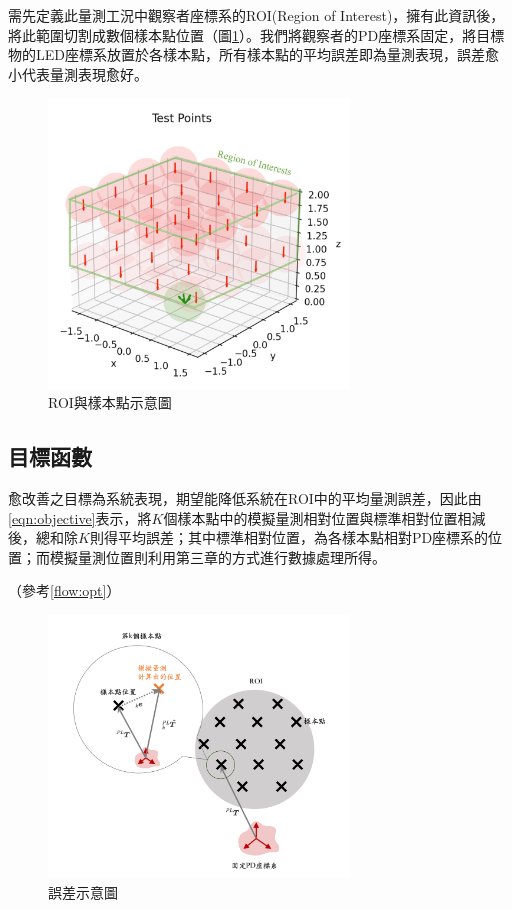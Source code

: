 需先定義此量測工況中觀察者座標系的ROI(Region of Interest)，擁有此資訊後，將此範圍切割成數個樣本點位置（圖\ref{pic:testpoint}）。我們將觀察者的PD座標系固定，將目標物的LED座標系放置於各樣本點，所有樣本點的平均誤差即為量測表現，誤差愈小代表量測表現愈好。

\begin{figure}[ht]
    \centering
    \includegraphics[width=8cm]{ch3pic/testpoint.jpg}
    \caption{ROI與樣本點示意圖}
    \label{pic:testpoint}
\end{figure}

\clearpage

\subsection{目標函數}

愈改善之目標為系統表現，期望能降低系統在ROI中的平均量測誤差，因此由\ref{eqn:objective}表示，將$K$個樣本點中的模擬量測相對位置與標準相對位置相減後，總和除$K$則得平均誤差；其中標準相對位置，為各樣本點相對PD座標系的位置；而模擬量測位置則利用第三章的方式進行數據處理所得。


（參考\ref{flow:opt}）

\begin{figure}[ht]
    \centering
    \includegraphics[width=8cm]{ch4pic/error.png}
    \caption{誤差示意圖}
    \label{pic:error}
\end{figure}


